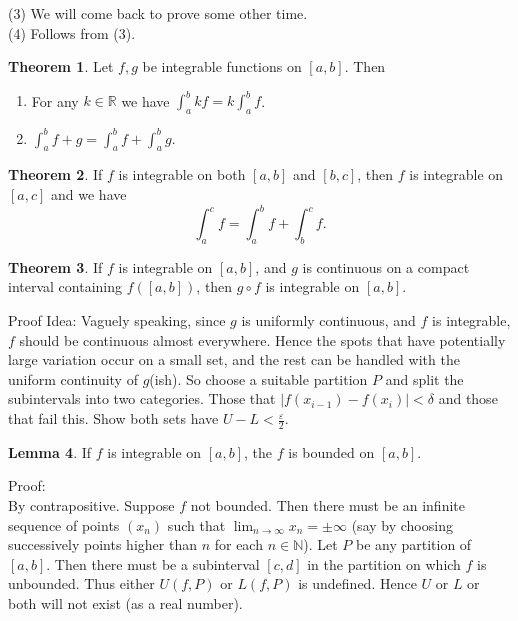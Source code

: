 \documentclass[12pt]{article}
\theoremstyle{definition}
\newtheorem{thm}{Theorem}
\newtheorem{lem}[thm]{Lemma}
\def\N{{\mathbb N}}
\def\R{{\mathbb R}}
\newcommand{\ds}{\displaystyle}
\begin{document}
(3) We will come back to prove some other time.\\

(4) Follows from (3).


\begin{thm}
    Let $f,g$ be integrable functions on $ [a,b] $. Then 
    \begin{enumerate}
	\item For any $k\in \R$ we have $\int_a^b kf=k \int_{a}^{b} f$.
	\item $ \int_{a}^{b} f+g = \int_{a}^{b} f + \int_{a}^{b}  g.    $ 
    \end{enumerate}
\end{thm}

\begin{thm}
    If $ f $ is integrable on both $[a,b] $ and $ [b,c] $, then $ f $ is integrable on $ [a,c] $ and we have 
    $$ \int_{a}^{c} f = \int_{a}^{b} f+ \int_{b}^{c}f.    $$ 
\end{thm}


\begin{thm}
    If $ f $ is integrable on $ [a,b] $, and $ g $ is continuous on a compact interval containing $ f([a,b]) $, then $ g\circ f $ is integrable on $ [a,b] $.
\end{thm}

Proof Idea: Vaguely speaking, since $ g $ is uniformly continuous, and $ f $ is integrable, $ f $ should be continuous almost everywhere. Hence the spots that have potentially large variation occur on a small set, and the rest can be handled with the uniform continuity of $ g $(ish). So choose a suitable partition $ P $ and split the subintervals into two categories. Those that $ |f(x_{i-1})-f(x_i)|<\delta $ and those that fail this. Show both sets have $ U-L< \frac{\varepsilon}{2} $. 

\begin{lem}
    If $ f $ is integrable on $ [a,b] $, the $ f $ is bounded on $ [a,b] $. 
\end{lem}

Proof:\\
By contrapositive. Suppose $ f $ not bounded. Then there must be an infinite sequence of points $ (x_n) $ such that $\ds \lim_{n\to \infty} x_n = \pm\infty$
(say by choosing successively points higher than $n $ for each $ n\in \N $). Let $ P $ be any partition of $ [a,b] $. Then  there must be a subinterval $ [c,d] $ in the partition on which $f$ is unbounded. Thus either $ U(f,P) $ or $ L(f,P) $ is undefined. Hence $ U $ or $ L $ or both will not exist (as a real number). 
\end{document}
